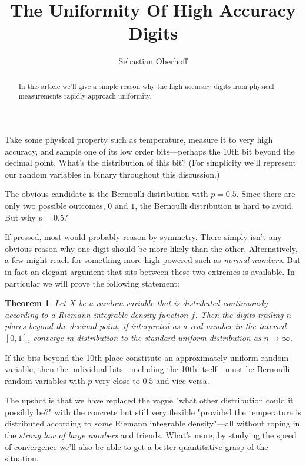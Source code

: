 \documentclass{article}
\theoremstyle{theorem}
\newtheorem{theorem}{Theorem}
\theoremstyle{definition}
\begin{document}
\title{The Uniformity Of High Accuracy Digits}
\author{Sebastian Oberhoff}

\maketitle

\begin{abstract}
In this article we'll give a simple reason why the high accuracy digits from physical measurements rapidly approach uniformity.
\end{abstract}


\noindent
Take some physical property such as temperature, measure it to very high accuracy, and sample one of its low order bits---perhaps the 10th bit beyond the decimal point. What's the distribution of this bit? (For simplicity we'll represent our random variables in binary throughout this discussion.)

The obvious candidate is the Bernoulli distribution with $p=0.5$. Since there are only two possible outcomes, $0$ and $1$, the Bernoulli distribution is hard to avoid. But why $p=0.5$?

If pressed, most would probably reason by symmetry. There simply isn't any obvious reason why one digit should be more likely than the other. Alternatively, a few might reach for something more high powered such as \textit{normal numbers}. But in fact an elegant argument that sits between these two extremes is available. In particular we will prove the following statement:

\begin{theorem}
Let $X$ be a random variable that is distributed continuously according to a Riemann integrable density function $f$. Then the digits trailing $n$ places beyond the decimal point, if interpreted as a real number in the interval $[0,1]$, converge in distribution to the standard uniform distribution as $n\to\infty$.
\end{theorem}

If the bits beyond the 10th place constitute an approximately uniform random variable, then the individual bits---including the 10th itself---must be Bernoulli random variables with $p$ very close to $0.5$ and vice versa.

The upshot is that we have replaced the vague "what other distribution could it possibly be?" with the concrete but still very flexible "provided the temperature is distributed according to \textit{some} Riemann integrable density"---all without roping in the \textit{strong law of large numbers} and friends. What's more, by studying the speed of convergence we'll also be able to get a better quantitative grasp of the situation.
\end{document}
